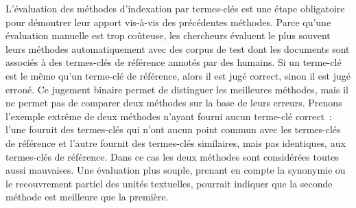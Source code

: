     L'évaluation des méthodes d'indexation par termes-clés est une étape
    obligatoire pour démontrer leur apport vis-à-vis des précédentes méthodes.
    Parce qu'une évaluation manuelle est trop coûteuse, les chercheurs évaluent
    le plus souvent leurs méthodes automatiquement avec des corpus de test dont
    les documents sont associés à des termes-clés de référence annotés par des
    humains. Si un terme-clé est le même qu'un terme-clé de référence, alors
    il est jugé correct, sinon il est jugé erroné. Ce jugement binaire permet
    de distinguer les meilleures méthodes, mais il ne permet pas de comparer
    deux méthodes sur la base de leurs erreurs. Prenons l'exemple extrême de
    deux méthodes n'ayant fourni aucun terme-clé correct~: l'une fournit
    des termes-clés qui n'ont aucun point commun avec les termes-clés de
    référence et l'autre fournit des termes-clés similaires, mais pas
    identiques, aux termes-clés de référence. Dans ce cas les deux méthodes sont
    considérées toutes aussi mauvaises. Une évaluation plus souple, prenant en
    compte la synonymie ou le recouvrement partiel des unités textuelles,
    pourrait indiquer que la seconde méthode est meilleure que la première.

